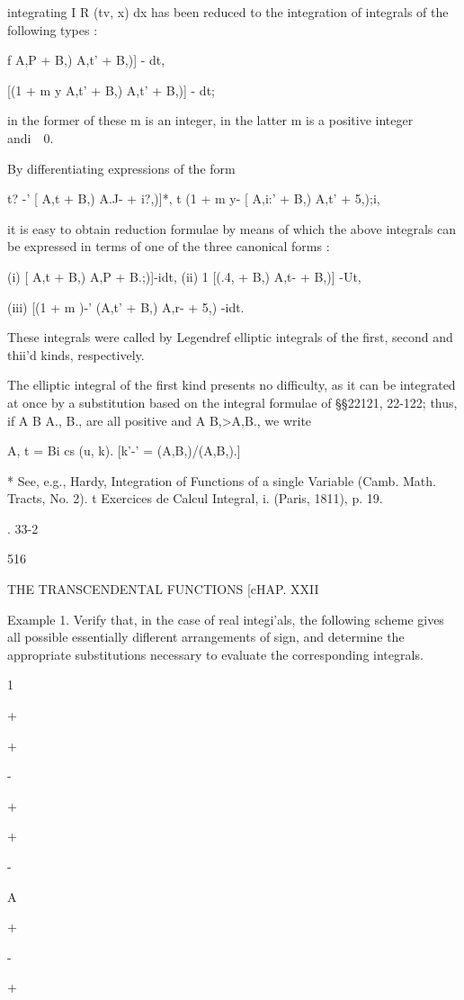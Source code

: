 integrating I R (tv, x) dx has been reduced to the integration of
integrals of the following types :

 f A,P + B,) A,t' + B,)] - dt,

[(1 + m y A,t' + B,) A,t' + B,)] - dt;

in the former of these m is an integer, in the latter m is a positive
integer andi\ \ 0.

By differentiating expressions of the form

t? -' [ A,t + B,) A.J- + i?,)]*, t (1 + m y- [ A,i:' + B,) A,t' +
5,);i,

it is easy to obtain reduction formulae by means of which the above
integrals can be expressed in terms of one of the three canonical
forms :

(i) [ A,t + B,) A,P + B.;)]-idt, (ii) 1 [(.4, + B,) A,t- + B,)] -Ut,

(iii) [(1 + m )-' (A,t' + B,) A,r- + 5,) -idt.

These integrals were called by Legendref elliptic integrals of the
first, second and thii'd kinds, respectively.

The elliptic integral of the first kind presents no difficulty, as it
can be integrated at once by a substitution based on the integral
formulae of §§22121, 22-122; thus, if A B A., B., are all positive and
A B,>A,B., we write

A, t = Bi cs (u, k). [k'-' = (A,B,)/(A,B,).]

* See, e.g., Hardy, Integration of Functions of a single Variable
(Camb. Math. Tracts, No. 2). t Exercices de Calcul Integral, i.
(Paris, 1811), p. 19.

. 33-2

516

THE TRANSCENDENTAL FUNCTIONS [cHAP. XXII

Example 1. Verify that, in the case of real integi'als, the following
scheme gives all possible essentially diflerent arrangements of sign,
and determine the appropriate substitutions necessary to evaluate the
corresponding integrals.

 1

+

+

-

+

+

-

A

+

-

+

